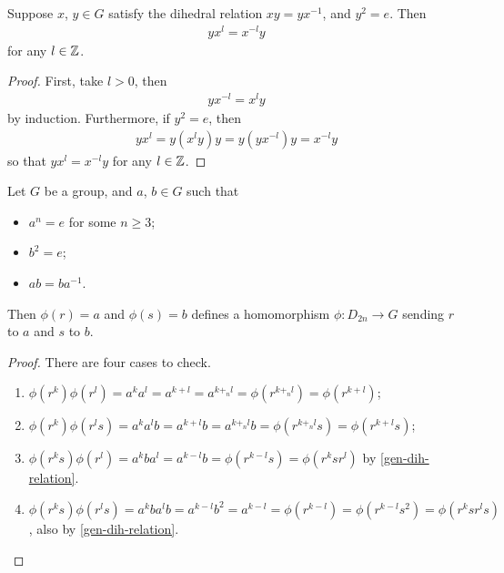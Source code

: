 \documentclass{../../template/note}
\begin{document}
    \begin{lemma}
        \label{gen-dih-relation}
        Suppose \(x\), \(y \in G\) satisfy the dihedral relation \(xy = yx^{-1}\), and \(y^2=e\). Then
        \begin{align*}
            yx^l = x^{-l}y
        \end{align*}
        for any \(l \in \mathbb Z\).        
    \end{lemma}
    
    \begin{proof}
        First, take \(l>0\), then
        \begin{align*}
            yx^{-l} = x^ly
        \end{align*}
        by induction. Furthermore, if \(y^2 = e\), then
        \begin{align*}
            yx^l = y (x^l y) y = y(yx^{-l})y = x^{-l}y
        \end{align*}
        so that \(yx^l = x^{-l}y\) for any \(l \in \mathbb Z\).
    \end{proof}
    
    \begin{lemma}
        Let \(G\) be a group, and \(a\), \(b \in G\) such that
        \begin{itemize}
            \item \(a^n = e\) for some \(n \geq 3\);
            \item \(b^2 = e\);
            \item \(ab = ba^{-1}\).
        \end{itemize}
        Then \(\phi(r) = a\) and \(\phi(s) = b\) defines a homomorphism \(\phi: D_{2n} \to G\) sending \(r\) to \(a\) and \(s\) to \(b\).
    \end{lemma}
    
    \begin{proof}
        There are four cases to check.
        \begin{enumerate}[label=\protect\circled{\arabic*}]
            \item \(\phi(r^k)\phi(r^l) = a^ka^l = a^{k+l} = a^{k+_nl} = \phi(r^{k+_nl}) = \phi(r^{k+l})\);
            \item \(\phi(r^k)\phi(r^ls) = a^ka^lb = a^{k+l}b = a^{k+_nl}b = \phi(r^{k+_nl}s) = \phi(r^{k+l}s)\);
            \item \(\phi(r^ks)\phi(r^l) = a^kba^l = a^{k-l}b = \phi(r^{k-l}s) = \phi(r^ksr^l)\) by \cref{gen-dih-relation}.
            \item \(\phi(r^ks)\phi(r^ls) = a^k b a^l b = a^{k-l} b^2 = a^{k-l} = \phi(r^{k-l}) = \phi(r^{k-l}s^2) = \phi(r^k s r^l s)\), also by \cref{gen-dih-relation}.
        \end{enumerate}
    \end{proof}
    
\end{document}

